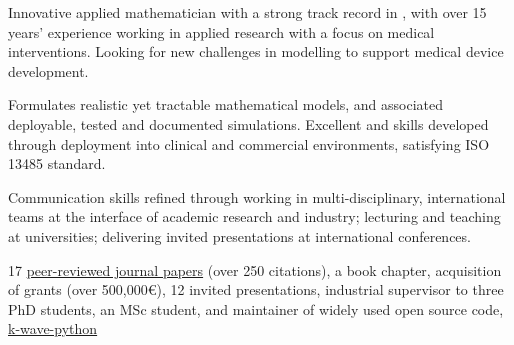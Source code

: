 \documentclass[english, print]{cv-style-wide}
\begin{document}

%
\setul{0.5ex}{0.4pt}%
Innovative applied mathematician with a strong track record in , with over 15 years' experience working in applied research with a focus on medical interventions. Looking for new challenges in modelling to support medical device development.
  \begin{NoHyphItemize}
    \item Formulates realistic yet tractable mathematical models, and associated deployable, tested and documented simulations.  Excellent  and  skills developed through deployment into clinical and commercial environments, satisfying ISO 13485 standard.  
    \item Communication skills refined through working in multi-disciplinary, international teams at the interface of academic research and industry; lecturing and teaching at universities; delivering invited presentations at international conferences.
    \item 17 \href{https://scholar.google.co.uk/citations?user=lauJqakAAAAJ&hl=en}{peer-reviewed journal papers} (over 250 citations), a book chapter, acquisition of grants (over 500,000\euro), 12 invited presentations, industrial supervisor to three PhD students, an MSc student, and maintainer of widely used open source code, \href{https://k-wave-python.readthedocs.io/en/latest/index.html#citation}{\ul{k-wave-python}}
  \end{NoHyphItemize}
  
\end{document}
